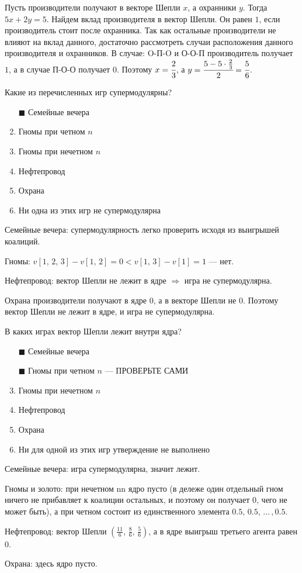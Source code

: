 	\solution
	Пусть производители получают в векторе Шепли $x$, а охранники $y$. Тогда $5x+2y=5$. Найдем вклад производителя в вектор Шепли. Он равен $1$, если производитель стоит после охранника. Так как остальные производители не влияют на вклад данного, достаточно рассмотреть случаи расположения данного производителя и охранников. В случае: O-П-O и О-О-П производитель получает $1$, а в случае П-О-О получает $0$. Поэтому $x= \cfrac{2}{3}$, а $y= \cfrac{5-5\cdot\frac{2}{3}}{2} = \cfrac{5}{6}$.
	
	\task Какие из перечисленных игр супермодулярны?
	\begin{enumerate}[label=$\square$]
		\item[$\blacksquare$] Семейные вечера
		\item Гномы при четном $n$
	 	\item Гномы при нечетном $n$
		\item Нефтепровод
		\item Охрана
		\item Ни одна из этих игр не супермодулярна
	\end{enumerate}

	\solution
	Семейные вечера: супермодулярность легко проверить исходя из выигрышей коалиций.
	
	Гномы: $v[1,\, 2,\, 3] - v[1,\, 2] = 0 < v[1,\, 3] - v[1] = 1$ --- нет.
	
	Нефтепровод: вектор Шепли не лежит в ядре $\Rightarrow$ игра не супермодулярна.
	
	Охрана производители получают в ядре $0$, а в векторе Шепли не $0$. Поэтому вектор Шепли не лежит в ядре, и игра не супермодулярна.
	
	\task В каких играх вектор Шепли лежит внутри ядра?
	
	\begin{enumerate}[label=$\square$]
		\item[$\blacksquare$] Семейные вечера
		\item[$\blacksquare$] Гномы при четном $n$ --- ПРОВЕРЬТЕ САМИ
		\item Гномы при нечетном $n$
		\item Нефтепровод
		\item Охрана
		\item Ни для одной из этих игр утверждение не выполнено
	\end{enumerate}

	\solution
	Семейные вечера: игра супермодулярна, значит лежит.
	
	Гномы и золото: при нечетном nn ядро пусто (в дележе один отдельный гном ничего не прибавляет к коалиции остальных, и поэтому он получает $0$, чего не может быть), а при четном состоит из единственного элемента $0.5,\,0.5,\,\ldots\,,0.5$.
	
	Нефтепровод: вектор Шепли $(\frac{11}{6},\, \frac{8}{6},\, \frac{5}{6})$, а в ядре выигрыш третьего агента равен $0$.
	
	Охрана: здесь ядро пусто.